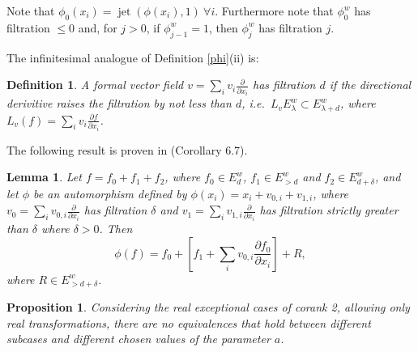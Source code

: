 \documentclass[noend]{amsproc}
\newtheorem{defn}[theorem]{Definition}
\newtheorem{prop}[theorem]{Proposition}
\newtheorem{lemma}[theorem]{Lemma}
\theoremstyle{definition}
\DeclareMathOperator{\jet}{jet}
\begin{document}
Note that $\phi_0(x_i)=\jet(\phi(x_i),1)\ \forall i$. Furthermore note that $\phi_0^w$ has filtration $\le 0$ and, for $j>0$, if $\phi_{j-1}^w=1$, then $\phi_j^w$ has filtration $j$. 


The infinitesimal analogue of Definition \ref{phi}(ii) is:

\begin{defn}
A formal vector field $v=\sum_i v_i\frac{\partial}{\partial x_i}$ has filtration $d$ if the directional derivitive raises the filtration by not less than $d$, i.e.~$L_vE^w_\lambda\subset E^w_{\lambda+d}$, where $L_v(f)=\sum_i v_i\frac{\partial f}{\partial x_i}$.
\end{defn}

The following result is proven in \cite{A1974} (Corollary 6.7).

\begin{lemma}\label{vectorlemma}
Let $f=f_0+f_1+f_2$, where $f_0\in E^w_d$, $f_1\in E^w_{>d}$ and $f_2\in E^w_{d+\delta}$, and let $\phi$ be an automorphism defined by $\phi(x_i)=x_i+v_{0,i}+v_{1,i}$, where $v_0=\sum_iv_{0,i}\frac{\partial}{\partial x_i}$ has filtration $\delta$ and $v_1=\sum_iv_{1,i}\frac{\partial}{\partial x_i}$ has filtration strictly greater than $\delta$ where $\delta>0$. Then
\[\phi(f)=f_0+\left[ f_1+\sum_iv_{0,i}\frac{\partial f_0}{\partial x_i}\right]+R,\]
where $R\in E^w_{>d+\delta}$.
\end{lemma}

\begin{prop}
Considering the real exceptional cases of corank 2, allowing only real transformations, there are no equivalences that hold between different subcases and different chosen values of the parameter $a$.
\end{prop}
\end{document}
